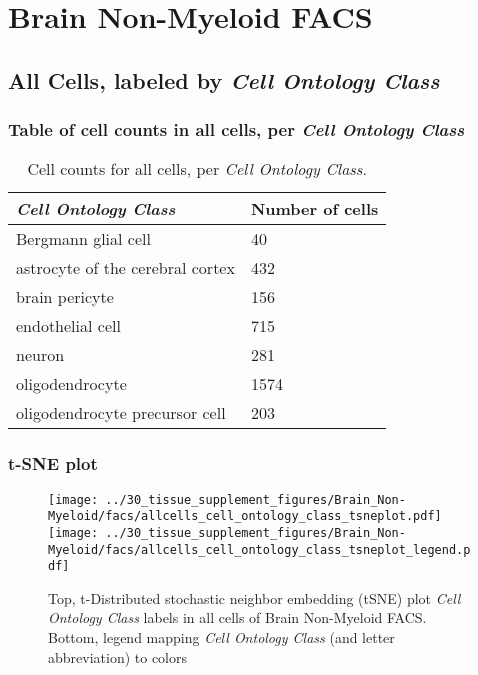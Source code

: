 \clearpage
\section{Brain Non-Myeloid FACS}

\subsection{All Cells, labeled by \emph{Cell Ontology Class}}
\subsubsection{Table of cell counts in all cells, per \emph{Cell Ontology Class}}\begin{table}[h]
\centering
\label{my-label}
\begin{tabular}{@{}ll@{}}
\toprule

\emph{Cell Ontology Class}& Number of cells \\ \midrule
Bergmann glial cell & 40 \\

astrocyte of the cerebral cortex & 432 \\

brain pericyte & 156 \\

endothelial cell & 715 \\

neuron & 281 \\

oligodendrocyte & 1574 \\

oligodendrocyte precursor cell & 203 \\
\bottomrule
\end{tabular}
\caption{Cell counts for all cells, per \emph{Cell Ontology Class}.}
\end{table}

\clearpage
\subsubsection{t-SNE plot}
\begin{figure}[h]
\centering
\texttt{[image: ../30\_tissue\_supplement\_figures/Brain\_Non-Myeloid/facs/allcells\_cell\_ontology\_class\_tsneplot.pdf]}
\texttt{[image: ../30\_tissue\_supplement\_figures/Brain\_Non-Myeloid/facs/allcells\_cell\_ontology\_class\_tsneplot\_legend.pdf]}
\caption{Top, t-Distributed stochastic neighbor embedding (tSNE) plot  \emph{Cell Ontology Class} labels in all cells of Brain Non-Myeloid FACS. Bottom, legend mapping \emph{Cell Ontology Class} (and letter abbreviation) to colors}
\end{figure}


